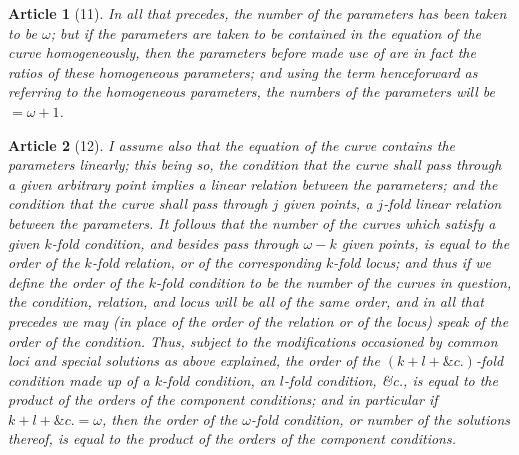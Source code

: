 \documentclass[11pt,a4paper]{article}
\theoremstyle{cayley}
\newtheorem{art}{Article}
\begin{document}
\begin{art}[11]
In all that precedes, the number of the parameters has been taken to be $\omega$; but if the parameters are taken to be contained in the equation of the curve homogeneously, then the parameters before made use of are in fact the ratios of these homogeneous parameters; and using the term henceforward as referring to the homogeneous parameters, the numbers of the parameters will be $= \omega + 1$.
\end{art}

\begin{art}[12]
I assume also that the equation of the curve contains the parameters linearly; this being so, the condition that the curve shall pass through a given arbitrary point implies a linear relation between the parameters; and the condition that the curve shall pass through $j$ given points, a $j$-fold linear relation between the parameters. It follows that the number of the curves which satisfy a given $k$-fold condition, and besides pass through $\omega - k$ given points, is equal to the order of the $k$-fold relation, or of the corresponding $k$-fold locus; and thus if we define the order of the $k$-fold condition to be the number of the curves in question, the condition, relation, and locus will be all of the same order, and in all that precedes we may (in place of the order of the relation or of the locus) speak of the order of the condition. Thus, subject to the modifications occasioned by common loci and special solutions as above explained, the order of the $(k+l+\&c.)$-fold condition made up of a $k$-fold condition, an $l$-fold condition, \&c., is equal to the product of the orders of the component conditions; and in particular if $k+l+\&c. = \omega$, then the order of the $\omega$-fold condition, or number of the solutions thereof, is equal to the product of the orders of the component conditions.
\end{art}
\end{document}
